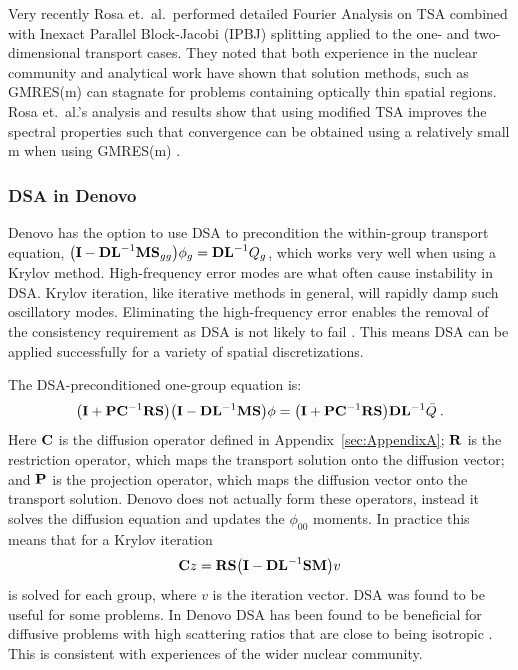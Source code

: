 Very recently Rosa et.\ al.\ performed detailed Fourier Analysis on TSA combined with Inexact Parallel Block-Jacobi (IPBJ) splitting applied to the one- and two-dimensional transport cases. They noted that both experience in the nuclear community and analytical work have shown that solution methods, such as GMRES(m) can stagnate for problems containing optically thin spatial regions. Rosa et.\ al.'s analysis and results show that using modified TSA improves the spectral properties such that convergence can be obtained using a relatively small m when using GMRES(m) \cite{Rosa2010}.

\subsubsection{DSA in Denovo}
Denovo has the option to use DSA to precondition the within-group transport equation, $\bigl(\mathbf{I} - \mathbf{DL}^{-1}\mathbf{MS}_{gg}\bigr) \phi_{g} = \mathbf{DL}^{-1}Q_{g}$, which works very well when using a Krylov method. High-frequency error modes are what often cause instability in DSA. Krylov iteration, like iterative methods in general, will rapidly damp such oscillatory modes. Eliminating the high-frequency error enables the removal of the consistency requirement as DSA is not likely to fail \cite{Evans2009d}. This means DSA can be applied successfully for a variety of spatial discretizations. 

The DSA-preconditioned one-group equation is:
%
\begin{equation}
  \bigl(\mathbf{I} + \mathbf{PC}^{-1}\mathbf{RS}\bigr) \bigl(\mathbf{I} - \mathbf{DL}^{-1}\mathbf{MS}\bigr) \phi = \bigl(\mathbf{I} + \mathbf{PC}^{-1}\mathbf{RS}\bigr)\mathbf{DL}^{-1}\bar{Q} \:. 
  \label{DSA1group}
\end{equation}
%
Here $\mathbf{C}$ is the diffusion operator defined in Appendix~\ref{sec:AppendixA}; $\mathbf{R}$ is the restriction operator, which maps the transport solution onto the diffusion vector; and $\mathbf{P}$ is the projection operator, which maps the diffusion vector onto the transport solution. Denovo does not actually form these operators, instead it solves the diffusion equation and updates the $\phi_{00}$ moments. In practice this means that for a Krylov iteration
%
\begin{equation}
  \mathbf{C}z = \mathbf{RS}\bigl(\mathbf{I} - \mathbf{DL}^{-1}\mathbf{SM}\bigr) v
\end{equation}
%
is solved for each group, where $v$ is the iteration vector. DSA was found to be useful for some problems. In Denovo DSA has been found to be beneficial for diffusive problems with high scattering ratios that are close to being isotropic \cite{Evans2009d}. This is consistent with experiences of the wider nuclear community.

